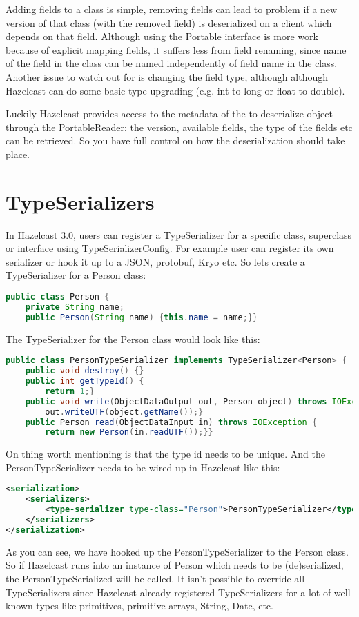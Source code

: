 Adding fields to a class is simple, removing fields can lead to problem if a new version of that class (with the removed field) is deserialized on a client which depends on that field. Although using the Portable interface is more work because of explicit mapping fields, it suffers less from field renaming, since name of the field in the class can be named independently of field name in the class. Another issue to watch out for is changing the field type, although although Hazelcast can do some basic type upgrading (e.g. int to long or float to double). 

Luckily Hazelcast provides access to the metadata of the to deserialize object through the PortableReader; the  version, available fields, the type of the fields etc can be retrieved. So you have full control on how the deserialization should take place. 

\section{TypeSerializers}
In Hazelcast 3.0, users can register a TypeSerializer for a specific class, superclass or interface using TypeSerializerConfig. For example user can register its own serializer or hook it up to a JSON, protobuf, Kryo etc. So lets create a TypeSerializer for a Person class:
\begin{lstlisting}[language=java]
public class Person {
    private String name;
    public Person(String name) {this.name = name;}}
\end{lstlisting}
The TypeSerializer for the Person class would look like this:
\begin{lstlisting}[language=java]
public class PersonTypeSerializer implements TypeSerializer<Person> {
    public void destroy() {}
    public int getTypeId() {
        return 1;}
    public void write(ObjectDataOutput out, Person object) throws IOException {
        out.writeUTF(object.getName());}
    public Person read(ObjectDataInput in) throws IOException {
        return new Person(in.readUTF());}}
\end{lstlisting}
On thing worth mentioning is that the type id needs to be unique. And the PersonTypeSerializer needs to be wired up in Hazelcast like this:
\begin{lstlisting}[language=xml]
<serialization>
    <serializers>
        <type-serializer type-class="Person">PersonTypeSerializer</type-serializer>
    </serializers>
</serialization>
\end{lstlisting}
As you can see, we have hooked up the PersonTypeSerializer to the Person class. So if Hazelcast runs into an instance of Person which needs to be (de)serialized, the PersonTypeSerialized will be called. It isn't possible to override all TypeSerializers since Hazelcast already registered TypeSerializers for a lot of well known types like primitives, primitive arrays, String, Date, etc.

